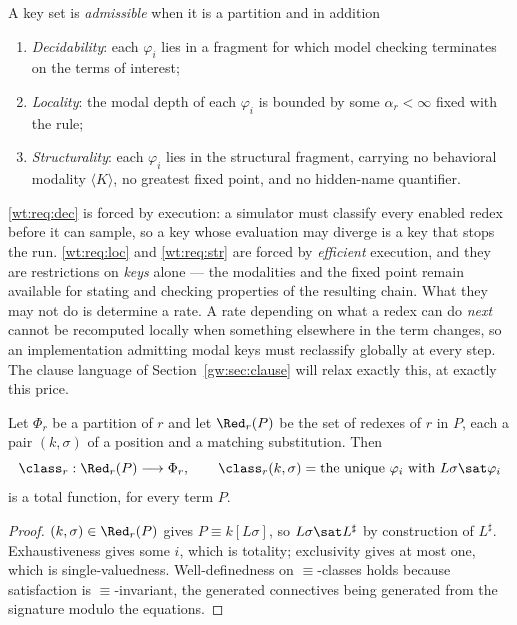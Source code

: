 \begin{definition}
\label{wt:def:reqs}
A key set is \emph{admissible} when it is a partition and in addition
\begin{enumerate}[label=(R\arabic*),leftmargin=3em]
  \item\label{wt:req:dec} \emph{Decidability}: each $\varphi_i$ lies in a fragment for
        which model checking terminates on the terms of interest;
  \item\label{wt:req:loc} \emph{Locality}: the modal depth of each $\varphi_i$ is bounded
        by some $\alpha_r < \infty$ fixed with the rule;
  \item\label{wt:req:str} \emph{Structurality}: each $\varphi_i$ lies in the structural
        fragment, carrying no behavioral modality $\langle K \rangle$, no greatest fixed
        point, and no hidden-name quantifier.
\end{enumerate}
\end{definition}

\ref{wt:req:dec} is forced by execution: a simulator must classify every enabled redex
before it can sample, so a key whose evaluation may diverge is a key that stops the run.
\ref{wt:req:loc} and \ref{wt:req:str} are forced by \emph{efficient} execution, and they
are restrictions on \emph{keys} alone --- the modalities and the fixed point remain
available for stating and checking properties of the resulting chain. What they may not
do is determine a rate. A rate depending on what a redex can do \emph{next} cannot be
recomputed locally when something elsewhere in the term changes, so an implementation
admitting modal keys must reclassify globally at every step. The clause language of
Section~\ref{gw:sec:clause} will relax exactly this, at exactly this price.

\begin{proposition}[Classification]
\label{wt:prop:classify}
Let $\Phi_r$ be a partition of $r$ and let $\Red_r(P)$ be the set of redexes of $r$ in
$P$, each a pair $(k,\sigma)$ of a position and a matching substitution. Then
\[
  \class_r : \Red_r(P) \longrightarrow \Phi_r,
  \qquad
  \class_r(k,\sigma) = \text{the unique } \varphi_i \text{ with } L\sigma \sat \varphi_i
\]
is a total function, for every term $P$.
\end{proposition}

\begin{proof}
$(k,\sigma) \in \Red_r(P)$ gives $P \equiv k[L\sigma]$, so $L\sigma \sat L^{\sharp}$ by
construction of $L^{\sharp}$. Exhaustiveness gives some $i$, which is totality;
exclusivity gives at most one, which is single-valuedness. Well-definedness on
$\equiv$-classes holds because satisfaction is $\equiv$-invariant, the generated
connectives being generated from the signature modulo the equations.
\end{proof}

